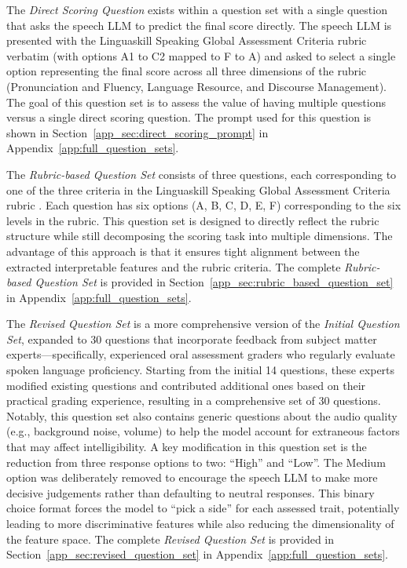 \documentclass{report}
\begin{document}
The \emph{Direct Scoring Question} exists within a question set with a single question that asks the speech LLM to predict the final score directly. The speech LLM is presented with the Linguaskill Speaking Global Assessment Criteria rubric \citep{cambridge2020linguaskill} verbatim (with options A1 to C2 mapped to F to A) and asked to select a single option representing the final score across all three dimensions of the rubric (Pronunciation and Fluency, Language Resource, and Discourse Management). The goal of this question set is to assess the value of having multiple questions versus a single direct scoring question. The prompt used for this question is shown in Section~\ref{app_sec:direct_scoring_prompt} in Appendix~\ref{app:full_question_sets}.

The \emph{Rubric-based Question Set} consists of three questions, each corresponding to one of the three criteria in the Linguaskill Speaking Global Assessment Criteria rubric \citep{cambridge2020linguaskill}. Each question has six options (A, B, C, D, E, F) corresponding to the six levels in the rubric. This question set is designed to directly reflect the rubric structure while still decomposing the scoring task into multiple dimensions. The advantage of this approach is that it ensures tight alignment between the extracted interpretable features and the rubric criteria. The complete \emph{Rubric-based Question Set} is provided in Section~\ref{app_sec:rubric_based_question_set} in Appendix~\ref{app:full_question_sets}.

The \emph{Revised Question Set} is a more comprehensive version of the \emph{Initial Question Set}, expanded to 30 questions that incorporate feedback from subject matter experts—specifically, experienced oral assessment graders who regularly evaluate spoken language proficiency. Starting from the initial 14 questions, these experts modified existing questions and contributed additional ones based on their practical grading experience, resulting in a comprehensive set of 30 questions. Notably, this question set also contains generic questions about the audio quality (e.g., background noise, volume) to help the model account for extraneous factors that may affect intelligibility. A key modification in this question set is the reduction from three response options to two: ``High'' and ``Low''. The Medium option was deliberately removed to encourage the speech LLM to make more decisive judgements rather than defaulting to neutral responses. This binary choice format forces the model to ``pick a side'' for each assessed trait, potentially leading to more discriminative features while also reducing the dimensionality of the feature space. The complete \emph{Revised Question Set} is provided in Section~\ref{app_sec:revised_question_set} in Appendix~\ref{app:full_question_sets}.
\end{document}
